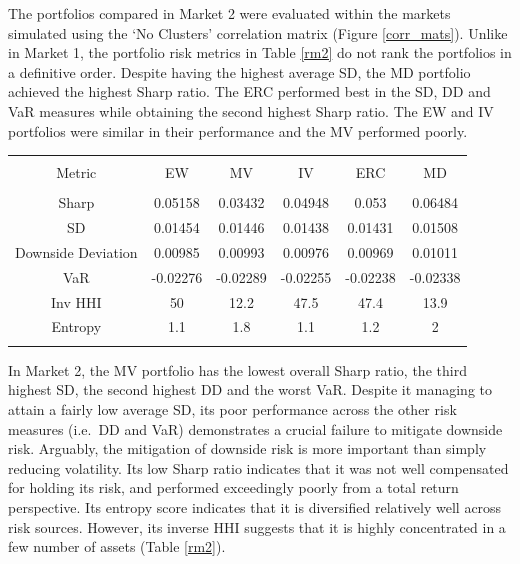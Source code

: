\documentclass[11pt,preprint, authoryear]{elsarticle}
\let\origtable\table
\let\endorigtable\endtable
\renewenvironment{table}[1][2] {
    \expandafter\origtable\expandafter[H]
} {
    \endorigtable
}
\numberwithin{equation}{section}
\numberwithin{figure}{section}
\numberwithin{table}{section}
\begin{document}
The portfolios compared in Market 2 were evaluated within the markets
simulated using the `No Clusters' correlation matrix (Figure
\ref{corr_mats}). Unlike in Market 1, the portfolio risk metrics in
Table \ref{rm2} do not rank the portfolios in a definitive order.
Despite having the highest average SD, the MD portfolio achieved the
highest Sharp ratio. The ERC performed best in the SD, DD and VaR
measures while obtaining the second highest Sharp ratio. The EW and IV
portfolios were similar in their performance and the MV performed
poorly.

\begin{table}[!htbp] \centering 
  \caption{Market 2 - Portfolio Risk Metrics} 
  \label{rm2} 
\begin{tabular}{@{\extracolsep{5pt}} cccccc} 
\\[-1.8ex]\hline 
\hline \\[-1.8ex] 
Metric & EW & MV & IV & ERC & MD \\ 
\hline \\[-1.8ex] 
Sharp & 0.05158 & 0.03432 & 0.04948 & 0.053 & 0.06484 \\ 
SD & 0.01454 & 0.01446 & 0.01438 & 0.01431 & 0.01508 \\ 
Downside Deviation & 0.00985 & 0.00993 & 0.00976 & 0.00969 & 0.01011 \\ 
VaR & -0.02276 & -0.02289 & -0.02255 & -0.02238 & -0.02338 \\ 
Inv HHI & 50 & 12.2 & 47.5 & 47.4 & 13.9 \\ 
Entropy & 1.1 & 1.8 & 1.1 & 1.2 & 2 \\ 
\hline \\[-1.8ex] 
\end{tabular} 
\end{table}

In Market 2, the MV portfolio has the lowest overall Sharp ratio, the
third highest SD, the second highest DD and the worst VaR. Despite it
managing to attain a fairly low average SD, its poor performance across
the other risk measures (i.e.~DD and VaR) demonstrates a crucial failure
to mitigate downside risk. Arguably, the mitigation of downside risk is
more important than simply reducing volatility. Its low Sharp ratio
indicates that it was not well compensated for holding its risk, and
performed exceedingly poorly from a total return perspective. Its
entropy score indicates that it is diversified relatively well across
risk sources. However, its inverse HHI suggests that it is highly
concentrated in a few number of assets (Table \ref{rm2}).
\end{document}
